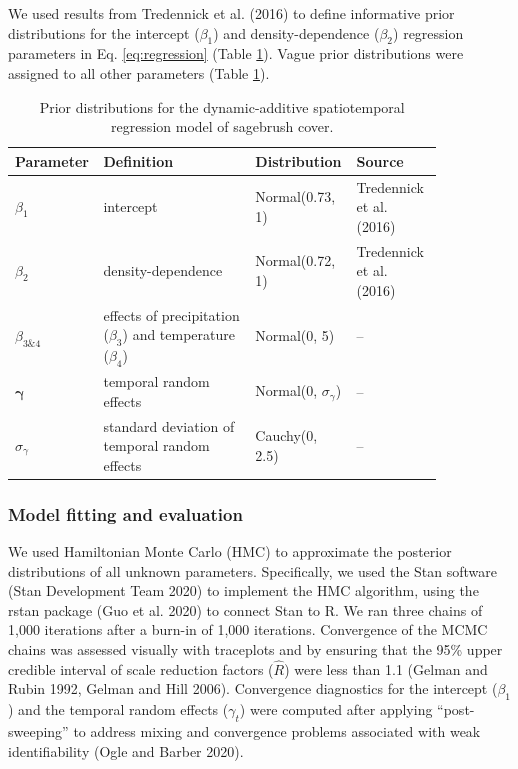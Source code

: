 \documentclass[
  12pt,
]{article}
\begin{document}
We used results from Tredennick et al. (2016) to define informative prior distributions for the intercept (\(\beta_1\)) and density-dependence (\(\beta_2\)) regression parameters in Eq. \ref{eq:regression} (Table \ref{tab:priors}).
Vague prior distributions were assigned to all other parameters (Table \ref{tab:priors}).

\begin{table}[tbp]
\caption{\label{tab:priors}Prior distributions for the dynamic-additive spatiotemporal regression model of sagebrush cover.}
\small
\begin{tabular}{p{0.1\linewidth}p{0.35\linewidth}p{0.2\linewidth}p{0.2\linewidth}}
\hline
Parameter & Definition & Distribution & Source \\ \hline
$\beta_1$ & intercept  & Normal(0.73, 1) & Tredennick et al. (2016) \\
$\beta_2$ & density-dependence & Normal(0.72, 1) & Tredennick et al. (2016) \\
$\beta_{3\&4}$ & effects of precipitation ($\beta_3$) and temperature ($\beta_4$) & Normal(0, 5) & --  \\ 
$\bm{\gamma}$ & temporal random effects & Normal(0, $\sigma_{\gamma}$) & -- \\
$\sigma_{\gamma}$ & standard deviation of temporal random effects & Cauchy(0, 2.5) & -- \\ \hline
\end{tabular}
\end{table}

\hypertarget{model-fitting-and-evaluation}{%
\subsubsection{Model fitting and evaluation}\label{model-fitting-and-evaluation}}

We used Hamiltonian Monte Carlo (HMC) to approximate the posterior distributions of all unknown parameters.
Specifically, we used the Stan software (Stan Development Team 2020) to implement the HMC algorithm, using the rstan package (Guo et al. 2020) to connect Stan to R.
We ran three chains of 1,000 iterations after a burn-in of 1,000 iterations.
Convergence of the MCMC chains was assessed visually with traceplots and by ensuring that the 95\% upper credible interval of scale reduction factors (\(\hat{R}\)) were less than 1.1 (Gelman and Rubin 1992, Gelman and Hill 2006).
Convergence diagnostics for the intercept (\(\beta_1\)) and the temporal random effects (\(\gamma_t\)) were computed after applying ``post-sweeping'' to address mixing and convergence problems associated with weak identifiability (Ogle and Barber 2020).
\end{document}
